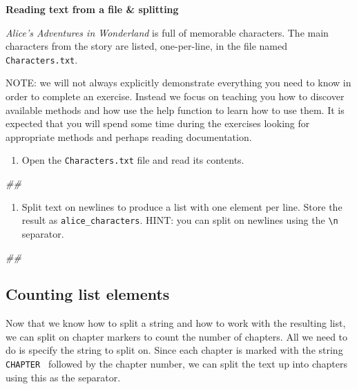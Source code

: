 \documentclass[]{book}
\newenvironment{Shaded}{\begin{snugshade}}{\end{snugshade}}
\newcommand{\CommentTok}[1]{\textcolor[rgb]{0.56,0.35,0.01}{\textit{#1}}}
\providecommand{\tightlist}{%
  \setlength{\itemsep}{0pt}\setlength{\parskip}{0pt}}
\begin{document}
\textbf{Reading text from a file \& splitting}

\emph{Alice's Adventures in Wonderland} is full of memorable characters.
The main characters from the story are listed, one-per-line, in the file
named \texttt{Characters.txt}.

NOTE: we will not always explicitly demonstrate everything you need to
know in order to complete an exercise. Instead we focus on teaching you
how to discover available methods and how use the help function to learn
how to use them. It is expected that you will spend some time during the
exercises looking for appropriate methods and perhaps reading
documentation.

\begin{enumerate}
\def\labelenumi{\arabic{enumi}.}
\tightlist
\item
  Open the \texttt{Characters.txt} file and read its contents.
\end{enumerate}

\begin{Shaded}
\begin{Highlighting}[]
\CommentTok{##}
\end{Highlighting}
\end{Shaded}

\begin{enumerate}
\def\labelenumi{\arabic{enumi}.}
\setcounter{enumi}{1}
\tightlist
\item
  Split text on newlines to produce a list with one element per line.
  Store the result as \texttt{alice\_characters}. HINT: you can split on
  newlines using the \texttt{\textbackslash{}n} separator.
\end{enumerate}

\begin{Shaded}
\begin{Highlighting}[]
\CommentTok{##}
\end{Highlighting}
\end{Shaded}

\subsection{Counting list elements}\label{counting-list-elements}

Now that we know how to split a string and how to work with the
resulting list, we can split on chapter markers to count the number of
chapters. All we need to do is specify the string to split on. Since
each chapter is marked with the string
\texttt{\textquotesingle{}CHAPTER\ \textquotesingle{}} followed by the
chapter number, we can split the text up into chapters using this as the
separator.
\end{document}
